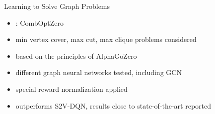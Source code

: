 \documentclass[aspectratio=1610]{beamer}
\newcommand{\important}[1]{{\color{green!60!black}#1}}
\begin{document}
\begin{frame}{Learning to Solve Graph Problems}
	\begin{itemize}
		\itemsep1.1ex
		\item {}: \important{CombOptZero}
		\item min vertex cover, max cut, max clique problems considered
		\item based on the principles of \important{AlphaGoZero}
		\item \important{different graph neural networks} tested, including GCN
		\item special reward normalization applied
		\item outperforms S2V-DQN, results close to state-of-the-art reported
		
	\end{itemize}
\end{frame}


\end{document}
